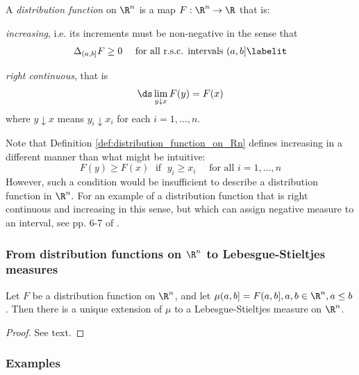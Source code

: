 \documentclass{article} %
\begin{document}
\begin{definition}
 A \textit{distribution function} on $\R^n$ is a map $F : \R^n \to \R$ that is:
 
 \begin{alphabate}
 \item \textit{increasing}, i.e. its increments must be non-negative in the sense that
 \begin{align*}
 \Delta_{(a,b]} F \geq 0 \quad \text{ for all r.s.c. intervals $(a,b]$}
 \labelit \label{eqn:increasing_condition_for_distribution_functions_on_Rn}
 \end{align*}



 \item \textit{right continuous}, that is
 \[ \ds\lim_{y \downarrow x} F(y) = F(x) \]
 where $y \downarrow x$ means $y_i \downarrow x_i$ for each $i=1,...,n$.
 \end{alphabate}
 \label{def:distribution_function_on_Rn}
 \end{definition}
 
 \begin{remark}
 Note that Definition \ref{def:distribution_function_on_Rn} defines increasing in a different manner than what might be intuitive:
 \[ F(y) \geq F(x) \; \text { if } \; y_i \geq x_i \quad \text{ for all } i=1,...,n\]
 However, such a condition would be insufficient to describe a distribution function in $\R^n.$ For an example of a distribution function that is right continuous and increasing in this sense, but which can assign negative measure to an interval, see pp. 6-7 of \cite{durrett2010probability}.
 \end{remark}

 \subsubsection{From distribution functions on $\R^n$ to Lebesgue-Stieltjes measures}
 
 \begin{theorem}
 Let $F$ be a distribution function on $\R^n$, and let $\mu(a,b] = F(a,b], a,b \in \R^n, a \leq b$. Then there is a unique extension of $\mu$ to a Lebesgue-Stieltjes measure on $\R^n$.	
 \end{theorem}
 
 \begin{proof}
 See text. 	
 \end{proof}

\subsubsection{Examples} \label{sec:examples_of_how_to_construct_lebesgue_stieltjes_measures_from_distribution_functions}
\end{document}

